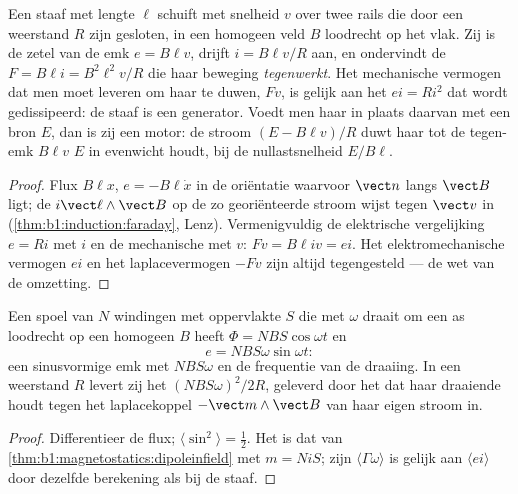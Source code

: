 \begin{proposition}\label{prop:b1:induction:rails}
Een staaf met lengte $\ell$ schuift met snelheid $v$ over twee rails die door een
weerstand $R$ zijn gesloten, in een homogeen veld $B$ loodrecht op het vlak. Zij is de
zetel van de emk $e = B\ell v$, drijft $i = B\ell v/R$ aan, en ondervindt de
 $F = B\ell i = B^2\ell^2v/R$ die haar beweging \emph{tegenwerkt}.
Het mechanische vermogen dat men moet leveren om haar te duwen, $Fv$, is gelijk aan het  $ei = Ri^2$ dat wordt gedissipeerd: de staaf is een generator. Voedt men haar in plaats daarvan met een
bron $E$, dan is zij een motor: de stroom $(E - B\ell v)/R$ duwt haar
tot de tegen-emk $B\ell v$ $E$ in evenwicht houdt, bij de nullastsnelheid $E/B\ell$.
\end{proposition}

\begin{proof}
Flux $B\ell x$, $e = -B\ell\dot x$ in de oriëntatie waarvoor $\vect n$ langs
$\vect B$ ligt; de  $i\vect\ell\wedge\vect B$ op de zo georiënteerde
stroom wijst tegen $\vect v$ in (\cref{thm:b1:induction:faraday},
Lenz). Vermenigvuldig de elektrische vergelijking $e = Ri$ met $i$ en de
mechanische met $v$: $Fv = B\ell iv = ei$. Het elektromechanische
vermogen $ei$ en het laplacevermogen $-Fv$ zijn altijd tegengesteld --- de wet
van de omzetting.
\end{proof}

\begin{proposition}\label{prop:b1:induction:alternator}
Een spoel van $N$ windingen met oppervlakte $S$ die met $\omega$ draait om een as
loodrecht op een homogeen $B$ heeft $\Phi = NBS\cos\omega t$ en
\[
e = NBS\omega\sin\omega t :
\]
een sinusvormige emk met  $NBS\omega$ en de frequentie van de draaiing.
In een weerstand $R$ levert zij het  $(NBS\omega)^2/2R$,
geleverd door het  dat haar draaiende houdt tegen het laplacekoppel
$-\vect m\wedge\vect B$ van haar eigen stroom in.
\end{proposition}

\begin{proof}
Differentieer de flux; $\langle\sin^2\rangle = \tfrac12$. Het  is dat van
\cref{thm:b1:magnetostatics:dipoleinfield} met $m = Ni S$; zijn  $\langle\Gamma\omega\rangle$ is gelijk aan $\langle ei\rangle$ door dezelfde
berekening als bij de staaf.
\end{proof}

